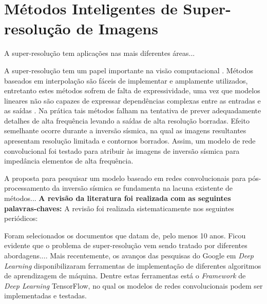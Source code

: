 % 
% 
\section{Métodos Inteligentes de Super-resolução de Imagens}

A super-resolução tem aplicações nas mais diferentes áreas...

A super-resolução tem um papel importante na visão computacional \cite{DongLoy2016}.
Métodos baseados em interpolação são fáceis de implementar e amplamente utilizados,
entretanto estes métodos sofrem de falta de expressividade, uma vez que modelos lineares
não são capazes de expressar dependências complexas entre as entradas e as saídas \cite{HsiehAndrews1978}.
Na prática tais métodos falham na tentativa de prever adequadamente detalhes de alta frequência
levando a saídas de alta resolução borradas. Efeito semelhante ocorre durante a inversão sísmica,
na qual as imagens resultantes apresentam resolução limitada e contornos borrados. Assim, um modelo
de rede convolucional foi testado para atribuir às imagens de inversão sísmica para impedância
elementos de alta frequência.

A proposta para pesquisar um modelo baseado em redes convolucionais para pós-processamento
da inversão sísmica se fundamenta na lacuna existente de métodos...
\textbf{A revisão da literatura foi realizada com as seguintes palavras-chaves:}
A revisão foi realizada sistematicamente nos seguintes periódicos:

Foram selecionados os documentos que datam de, pelo menos 10 anos. Ficou evidente que o problema
de super-resolução vem sendo tratado por diferentes abordagens....
Mais recentemente, os avanços das pesquisas do Google em \textit{Deep Learning} disponibilizaram
ferramentas de implementação de diferentes algoritmos de aprendizagem de máquina. Dentre estas
ferramentas está o \textit{Framework} de \textit{Deep Learning} TensorFlow, no qual os modelos
de redes convolucionais podem ser implementadas e testadas.

